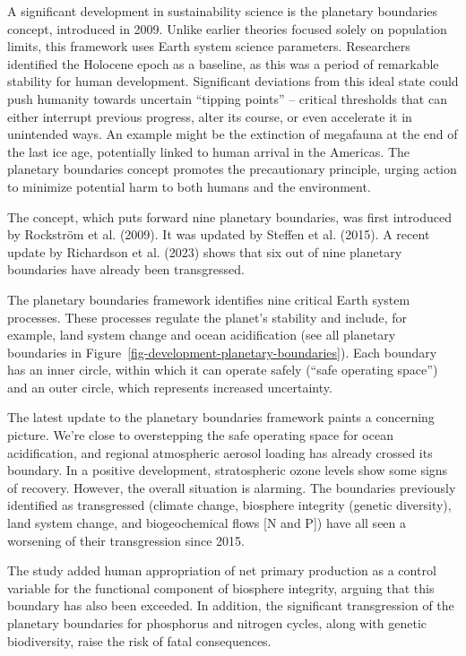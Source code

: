 \documentclass[
  a4paper,
  DIV=11,
  numbers=noendperiod,
  oneside,
  openany]{scrreprt}
\begin{document}
A significant development in sustainability science is the planetary
boundaries concept, introduced in 2009. Unlike earlier theories focused
solely on population limits, this framework uses Earth system science
parameters. Researchers identified the Holocene epoch as a baseline, as
this was a period of remarkable stability for human development.
Significant deviations from this ideal state could push humanity towards
uncertain ``tipping points'' -- critical thresholds that can either
interrupt previous progress, alter its course, or even accelerate it in
unintended ways. An example might be the extinction of megafauna at the
end of the last ice age, potentially linked to human arrival in the
Americas. The planetary boundaries concept promotes the precautionary
principle, urging action to minimize potential harm to both humans and
the environment.

The concept, which puts forward nine planetary boundaries, was first
introduced by Rockström et al. (2009). It was updated by Steffen et al.
(2015). A recent update by Richardson et al. (2023) shows that six out
of nine planetary boundaries have already been transgressed.

The planetary boundaries framework identifies nine critical Earth system
processes. These processes regulate the planet's stability and include,
for example, land system change and ocean acidification (see all
planetary boundaries in
Figure~\ref{fig-development-planetary-boundaries}). Each boundary has an
inner circle, within which it can operate safely (``safe operating
space'') and an outer circle, which represents increased uncertainty.

The latest update to the planetary boundaries framework paints a
concerning picture. We're close to overstepping the safe operating space
for ocean acidification, and regional atmospheric aerosol loading has
already crossed its boundary. In a positive development, stratospheric
ozone levels show some signs of recovery. However, the overall situation
is alarming. The boundaries previously identified as transgressed
(climate change, biosphere integrity (genetic diversity), land system
change, and biogeochemical flows {[}N and P{]}) have all seen a
worsening of their transgression since 2015.

The study added human appropriation of net primary production as a
control variable for the functional component of biosphere integrity,
arguing that this boundary has also been exceeded. In addition, the
significant transgression of the planetary boundaries for phosphorus and
nitrogen cycles, along with genetic biodiversity, raise the risk of
fatal consequences.
\end{document}
